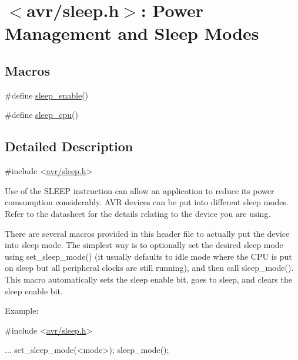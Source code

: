 \hypertarget{group__avr__sleep}{}\section{$<$avr/sleep.h$>$\+: Power Management and Sleep Modes}
\label{group__avr__sleep}
\subsection*{Macros}
\begin{DoxyCompactItemize}
\item 
\#define \hyperlink{group__avr__sleep_ga3f159a946a8e6df0ea4d67414e9a8d87}{sleep\+\_\+enable}()                      
\item 
\#define \hyperlink{group__avr__sleep_ga86db03d7b75cab8008152e846940e549}{sleep\+\_\+cpu}()                                                        
\end{DoxyCompactItemize}


\subsection{Detailed Description}

\begin{DoxyCode}
\textcolor{preprocessor}{#include <\hyperlink{sleep_8h}{avr/sleep.h}>}
\end{DoxyCode}


Use of the {\ttfamily S\+L\+E\+EP} instruction can allow an application to reduce its power comsumption considerably. A\+VR devices can be put into different sleep modes. Refer to the datasheet for the details relating to the device you are using.

There are several macros provided in this header file to actually put the device into sleep mode. The simplest way is to optionally set the desired sleep mode using {\ttfamily set\+\_\+sleep\+\_\+mode()} (it usually defaults to idle mode where the C\+PU is put on sleep but all peripheral clocks are still running), and then call {\ttfamily sleep\+\_\+mode()}. This macro automatically sets the sleep enable bit, goes to sleep, and clears the sleep enable bit.

Example\+: 
\begin{DoxyCode}
\textcolor{preprocessor}{#include <\hyperlink{sleep_8h}{avr/sleep.h}>}

...
  set\_sleep\_mode(<mode>);
  sleep\_mode();
\end{DoxyCode}


